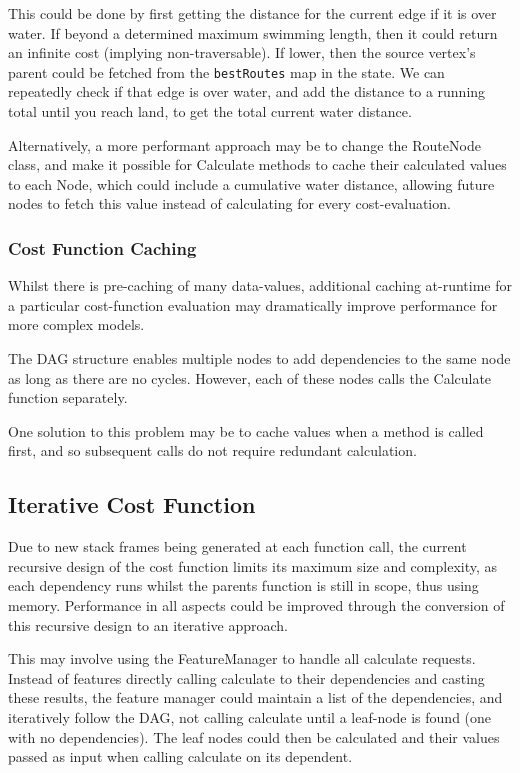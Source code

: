 \documentclass[12pt]{article}
\begin{document}
This could be done by first getting the distance for the current edge if it is over water. If beyond a determined maximum swimming length, then it could return an infinite cost (implying non-traversable). If lower, then the source vertex's parent could be fetched from the \texttt{bestRoutes} map in the state. We can repeatedly check if that edge is over water, and add the distance to a running total until you reach land, to get the total current water distance.

Alternatively, a more performant approach may be to change the RouteNode class, and make it possible for Calculate methods to cache their calculated values to each Node, which could include a cumulative water distance, allowing future nodes to fetch this value instead of calculating for every cost-evaluation.

\subsubsection{Cost Function Caching}

Whilst there is pre-caching of many data-values, additional caching at-runtime for a particular cost-function evaluation may dramatically improve performance for more complex models.

The DAG structure enables multiple nodes to add dependencies to the same node as long as there are no cycles. However, each of these nodes calls the Calculate function separately.

One solution to this problem may be to cache values when a method is called first, and so subsequent calls do not require redundant calculation.

\subsection{Iterative Cost Function}

Due to new stack frames being generated at each function call, the current recursive design of the cost function limits its maximum size and complexity, as each dependency runs whilst the parents function is still in scope, thus using memory. Performance in all aspects could be improved through the conversion of this recursive design to an iterative approach.

This may involve using the FeatureManager to handle all calculate requests. Instead of features directly calling calculate to their dependencies and casting these results, the feature manager could maintain a list of the dependencies, and iteratively follow the DAG, not calling calculate until a leaf-node is found (one with no dependencies). The leaf nodes could then be calculated and their values passed as input when calling calculate on its dependent.
\end{document}
